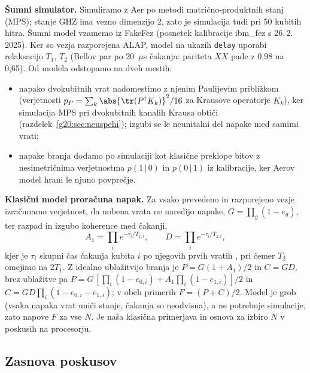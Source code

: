 \textbf{Šumni simulator.} Simuliramo z Aer po metodi matrično-produktnih stanj (MPS); stanje GHZ ima vezno dimenzijo 2, zato je
simulacija tudi pri 50 kubitih hitra. Šumni model vzamemo iz FakeFez (posnetek kalibracije ibm\_fez s 26.\,2.\,2025). Ker so
vezja razporejena ALAP, model na ukazih \texttt{delay} uporabi relaksacijo $T_1$, $T_2$ (Bellov par po 20~$\mu$s čakanja: pariteta
$XX$ pade z 0,98 na 0,65). Od modela odstopamo na dveh mestih:
\begin{itemize}
\item napako dvokubitnih vrat nadomestimo z njenim Paulijevim približkom (verjetnosti $p_P=\sum_k\abs{\tr(P^\dagger K_k)}^2/16$
      za Krausove operatorje $K_k$), ker simulacija MPS pri dvokubitnih kanalih Krausa obtiči
      (razdelek~\ref{g20:sec:neuspehi}); izgubi se le neunitalni del napake med samimi vrati;
\item napake branja dodamo po simulaciji kot klasične preklope bitov z nesimetričnima verjetnostma $p(1\,|\,0)$ in
      $p(0\,|\,1)$ iz kalibracije, ker Aerov model hrani le njuno povprečje.
\end{itemize}

\textbf{Klasični model proračuna napak.} Za vsako prevedeno in razporejeno vezje izračunamo verjetnost, da nobena vrata ne
naredijo napake, $G=\prod_g(1-e_g)$, ter razpad in izgubo koherence med čakanji,
\begin{equation}
A_1=\prod_i e^{-\tau_i/T_{1,i}}, \qquad D=\prod_i e^{-\tau_i/T_{2,i}},
\label{g20:eq:model}
\end{equation}
kjer je $\tau_i$ skupni čas čakanja kubita $i$ po njegovih prvih vratih , pri čemer $T_2$ omejimo na $2T_1$. Z idealno ublažitvijo branja je $P=G(1+A_1)/2$ in
$C=GD$, brez ublažitve pa $P=G\,[\prod_i(1-e_{0,i})+A_1\prod_i(1-e_{1,i})]/2$ in $C=GD\prod_i(1-e_{0,i}-e_{1,i})$; v obeh
primerih $F=(P+C)/2$. Model je grob (vsaka napaka vrat uniči stanje, čakanja so neodvisna), a ne potrebuje simulacije, zato
napove $F$ za vse $N$. Je naša klasična primerjava in osnova za izbiro $N$ v poskusih na procesorju.

\subsection{Zasnova poskusov}
\label{g20:sec:poskusi}

